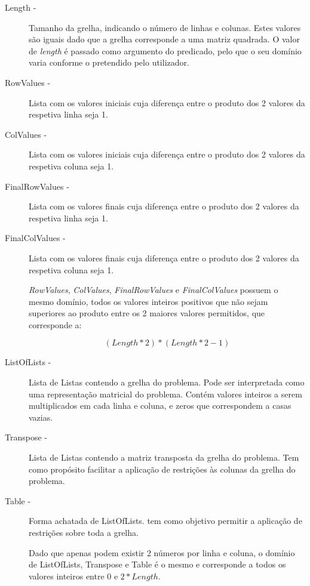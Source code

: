\documentclass[11pt]{article}
\begin{document}
\begin{description}

\item[Length - ] Tamanho da grelha, indicando o número de linhas e colunas. Estes valores são 
iguais dado que a grelha corresponde a uma matriz quadrada. O valor de \emph{length} é passado 
como argumento do predicado, pelo que o seu domínio varia conforme o pretendido pelo utilizador.

\item[RowValues - ] Lista com os valores iniciais cuja diferença entre o produto dos 2 valores 
da respetiva linha seja 1.

\item[ColValues - ] Lista com os valores iniciais cuja diferença entre o produto dos 2 valores 
da respetiva coluna seja 1.

\item[FinalRowValues - ] Lista com os valores finais cuja diferença entre o produto dos 2 valores da respetiva linha seja 1.

\item[FinalColValues - ] Lista com os valores finais cuja diferença entre o produto dos 2 valores da respetiva coluna seja 1.

\emph{RowValues}, \emph{ColValues}, \emph{FinalRowValues} e \emph{FinalColValues} possuem o mesmo domínio, todos os valores inteiros positivos que não sejam superiores ao produto entre os 2 maiores valores permitidos, que corresponde a:

\[(Length *2)*(Length * 2 - 1)\]

\item[ListOfLists - ] Lista de Listas contendo a grelha do problema. Pode ser interpretada 
como uma representação matricial do problema. Contém valores inteiros a serem multiplicados 
em cada linha e coluna, e zeros que correspondem a casas vazias.

\item[Transpose - ] Lista de Listas contendo a matriz transposta da grelha do problema. Tem 
como propósito facilitar a aplicação de restrições às colunas da grelha do problema.

\item[Table - ] Forma achatada de ListOfLists. tem como objetivo permitir a aplicação de 
restrições sobre toda a grelha. 

Dado que apenas podem existir 2 números por linha e coluna, o domínio de ListOfLists, 
Transpose e Table é o mesmo e corresponde a todos os valores inteiros entre 0 e \(2*Length\).



\end{description}
\end{document}
